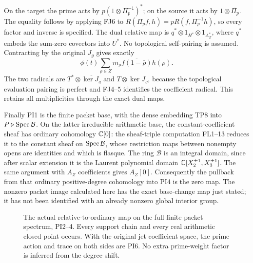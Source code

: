 On the target the prime acts by
$p(1\otimes\Pi_p^{-1})^*$; on the source it acts by
$1\otimes\overline{\Pi_p}$. The equality follows by applying
FJ6 to $R(\Pi_pf,h)=pR(f,\Pi_p^{-1}h)$, so every factor and
inverse is specified. The dual relative map is
$q^*\otimes1_{H^*}\otimes1_{A_Z^*}$, where $q^*$ embeds the
sum-zero covectors into $U^*$. No topological self-pairing is
assumed. Contracting by the original $J_g$ gives exactly
\[
 \phi(t)\sum_{\rho\in Z}m_\rho
       \overline{f(1-\bar\rho)}h(\rho).
 \tag{PI9}\label{pi:contracted-duality}
\]
The two radicals are $T^*\otimes\overline{\ker J_g}$ and
$T\otimes\ker J_g$, because the topological evaluation pairing
is perfect and FJ4--5 identifies the coefficient radical.
This retains all multiplicities through the exact dual maps.

Finally PI1 is the finite packet base, with the dense embedding
TP8 into $P\triangleright\operatorname{Spec}\mathcal B$. On the latter
irreducible arithmetic base, the constant-coefficient sheaf has
ordinary cohomology $\mathbb C[0]$: the sheaf-triple computation FL1--13
reduces it to the constant sheaf on $\operatorname{Spec}\mathcal B$, whose
restriction maps between nonempty opens are identities and
which is flasque. The ring $\mathcal B$ is an integral domain,
since after scalar extension it is the Laurent polynomial
domain $\mathbb C[X_2^{\pm1},X_3^{\pm1}]$. The same argument with
$A_Z$ coefficients gives $A_Z[0]$. Consequently the pullback
from that ordinary positive-degree cohomology into PI4 is the
zero map. The nonzero packet image calculated here has the exact
base-change map just stated; it has not been identified with
an already nonzero global interior group.

\begin{figure}[ht]
\centering
{}
\caption{The actual relative-to-ordinary map on the full finite
packet spectrum, PI2--4. Every support chain and every real
arithmetic closed point occurs. With the original jet coefficient
space, the prime action and trace on both sides are PI6.
No extra prime-weight factor is inferred from the degree shift.}
\end{figure}
